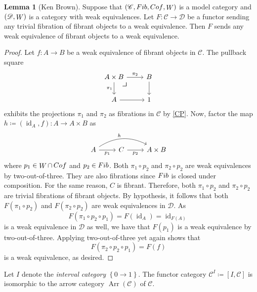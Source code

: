 \documentclass[10pt,letterpaper,cm]{nupset}
\theoremstyle{definition}
\theoremstyle{theorem}
\newtheorem{lemma}[definition]{Lemma}
\theoremstyle{remark}
\newcommand{\0}{\mathbf{0}}
\newcommand{\1}{\mathbf{1}}
\newcommand{\2}{\mathbf{2}}
\DeclareMathOperator{\Ar}{Arr}
\renewcommand{\c}{\mathscr{C}}
\renewcommand{\d}{\mathscr{D}}
\DeclareMathOperator{\idd}{id}
\DeclareMathOperator{\fib}{\mathnormal{Fib}}
\DeclareMathOperator{\cof}{\mathnormal{Cof}}
\DeclareMathOperator{\we}{\mathnormal{W}}
\begin{document}
\begin{lemma}[Ken Brown]\label{KB}
Suppose that $\left(\c, \fib, \cof, \we\right)$ is a model category and $\left(\d, \we\right)$ is a category with weak equivalences. Let $F: \c \to \d$ be a functor sending any trivial fibration  of fibrant objects to a weak equivalence. Then $F$ sends any weak equivalence of fibrant objects to a weak equivalence. 
\end{lemma}
\begin{proof}
Let $f : A \to B$ be a weak equivalence of fibrant objects in $\c$. The pullback square
\[
\begin{tikzcd}
A\times B \arrow[d, "\pi_1"'] \arrow[r, "\pi_2"] 
\arrow[dr, phantom, "\scalebox{1.5}{\color{black}$\lrcorner$}" , very near start, color=black]& B \arrow[d] \\
A \arrow[r]                                      & 1          
\end{tikzcd}
\] exhibits the projections $\pi_1$ and $\pi_2$ as fibrations in $\c$ by \cref{CP}. Now, factor the  map $h\coloneqq \left(\idd_A, f\right) : A \to A \times B$ as
\[
\begin{tikzcd}
A \arrow[r, "p_1"'] \arrow[rr, "h", bend left] & C \arrow[r, "p_2"'] & {A\times B}
\end{tikzcd}
\] where $p_1 \in \we \cap \cof$ and $p_2\in \fib$. Both $\pi_1 \circ p_2$ and $\pi_2 \circ p_2$ are weak equivalences by two-out-of-three. They are also fibrations since $\fib$ is closed under composition. For the same reason, $C$ is fibrant. Therefore, both $\pi_1 \circ p_2$ and $\pi_2 \circ p_2$ are trivial fibrations of fibrant objects. By hypothesis, it follows that both $F(\pi_1 \circ p_2)$ and $F(\pi_2 \circ p_2)$ are weak equivalences in $\d$. As $$F(\pi_1 \circ p_2 \circ p_1) = F(\idd_A) = \idd_{F(A)}$$ is  a weak equivalence in $\d$ as well, we have that $F(p_1)$ is a weak equivalence by two-out-of-three. Applying two-out-of-three yet again shows that $$F(\pi_2 \circ p_2\circ p_1) =F(f)$$ is a weak equivalence, as desired.  
\end{proof}

\smallskip

Let  $I$ denote the \textit{interval category} $\left\{0 \to 1\right\}$. The functor category $\c^I \coloneqq \left[I, \c\right]$ is isomorphic to the arrow category $\Ar(\c)$ of $\c$.
\end{document}
